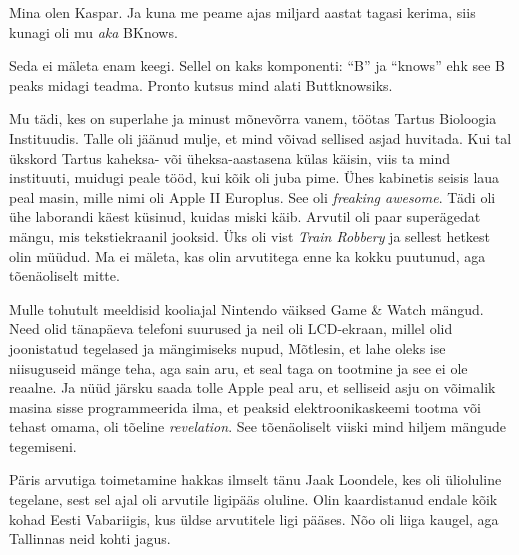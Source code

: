 

Mina olen Kaspar. Ja kuna me peame ajas miljard aastat tagasi kerima, siis kunagi oli mu \emph{aka} BKnows. 


Seda ei mäleta enam keegi. Sellel on kaks komponenti: 
\enquote{B} ja \enquote{knows} ehk see B peaks midagi 
teadma. Pronto kutsus mind alati Buttknowsiks.


Mu tädi, kes on superlahe ja minust mõnevõrra vanem, 
töötas Tartus Bioloogia Instituudis. Talle oli jäänud mulje, et mind võivad 
sellised asjad huvitada. Kui tal ükskord Tartus kaheksa- või üheksa-aastasena
külas käisin, viis ta mind instituuti, muidugi peale tööd, kui kõik oli juba pime. 
Ühes kabinetis seisis laua peal masin, mille nimi oli Apple II 
Europlus. See oli \emph{freaking awesome}. 
Tädi oli ühe laborandi käest küsinud, kuidas miski käib. Arvutil oli paar 
superägedat mängu, mis tekstiekraanil jooksid. Üks oli vist \emph{Train 
Robbery} ja sellest hetkest olin müüdud. Ma ei mäleta, kas 
olin arvutitega enne ka kokku puutunud, aga tõenäoliselt mitte. 

Mulle tohutult meeldisid kooliajal Nintendo väiksed Game \& 
Watch mängud. Need olid tänapäeva 
telefoni suurused ja neil oli LCD-ekraan, millel olid joonistatud 
tegelased ja mängimiseks nupud, Mõtlesin, et 
lahe oleks ise niisuguseid mänge teha, aga sain aru, et seal taga 
on tootmine ja see ei ole reaalne. Ja nüüd järsku saada tolle Apple peal aru, et 
selliseid asju on võimalik masina sisse programmeerida ilma, et peaksid 
elektroonikaskeemi tootma või tehast omama, oli tõeline
\emph{revelation}. See tõenäoliselt viiski mind hiljem
mängude tegemiseni. 

Päris arvutiga toimetamine hakkas ilmselt tänu Jaak 
Loondele, kes oli ülioluline tegelane, sest 
sel ajal oli arvutile ligipääs oluline. 
Olin kaardistanud endale kõik kohad Eesti Vabariigis, kus üldse 
arvutitele ligi pääses. Nõo oli liiga kaugel, aga Tallinnas neid kohti jagus. 

